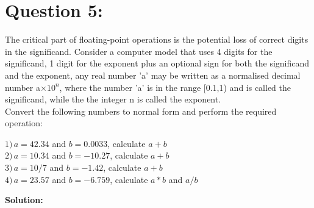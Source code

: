 \documentclass[a4paper,12pt]{article}
\begin{document}
\newpage
\section*{\LARGE Question 5:}
 The critical part of floating-point operations is the potential loss of correct digits in the significand. Consider a computer model that uses 4 digits for the significand, 1 digit for the exponent plus an optional sign for both the significand and the exponent, any real number 'a' may be written as a normalised decimal number a$\times10^n$, where the number 'a' is in the range [0.1,1) and is called the significand, while the the integer n is called the exponent.\\
Convert the following numbers to normal form and perform the required operation:
 \begin{flushleft}
$1)\,a = 42.34$ and $b = 0.0033$, calculate $a+b$\\
$2)\,a = 10.34$ and $b =-10.27$, calculate $a+b$\\
$3)\,a = 10/7$ and $b =-1.42$, calculate $a+b$\\
$4)\,a = 23.57$ and $b =-6.759$, calculate $a*b$ and $a/b$
 \end{flushleft}
 {\color{blue}\textbf{Solution: \\}}
 \\
 \\
  \\[0.5cm]
  \\
 \\
  \\[0.5cm]
  \\
 \\
  \\[0.5cm]
   \\
 \\
  \\
   \\
\newpage
\end{document}
